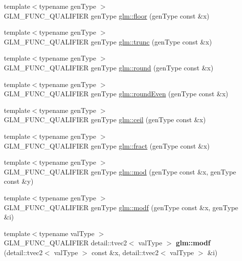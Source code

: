 \begin{DoxyCompactItemize}
\item 
{\footnotesize template$<$typename gen\+Type $>$ }\\G\+L\+M\+\_\+\+F\+U\+N\+C\+\_\+\+Q\+U\+A\+L\+I\+F\+I\+E\+R gen\+Type \hyperlink{group__core__func__common_ga86350252cc9bf86421317460bbd1f21c}{glm\+::floor} (gen\+Type const \&x)
\item 
{\footnotesize template$<$typename gen\+Type $>$ }\\G\+L\+M\+\_\+\+F\+U\+N\+C\+\_\+\+Q\+U\+A\+L\+I\+F\+I\+E\+R gen\+Type \hyperlink{group__core__func__common_gadb091aed51e45872f6dc841affa41c5c}{glm\+::trunc} (gen\+Type const \&x)
\item 
{\footnotesize template$<$typename gen\+Type $>$ }\\G\+L\+M\+\_\+\+F\+U\+N\+C\+\_\+\+Q\+U\+A\+L\+I\+F\+I\+E\+R gen\+Type \hyperlink{group__core__func__common_ga75ebab3fe88a9c5c769135cf5a2649ef}{glm\+::round} (gen\+Type const \&x)
\item 
{\footnotesize template$<$typename gen\+Type $>$ }\\G\+L\+M\+\_\+\+F\+U\+N\+C\+\_\+\+Q\+U\+A\+L\+I\+F\+I\+E\+R gen\+Type \hyperlink{group__core__func__common_ga6535952553479a4bbca7f1f12a011b17}{glm\+::round\+Even} (gen\+Type const \&x)
\item 
{\footnotesize template$<$typename gen\+Type $>$ }\\G\+L\+M\+\_\+\+F\+U\+N\+C\+\_\+\+Q\+U\+A\+L\+I\+F\+I\+E\+R gen\+Type \hyperlink{group__core__func__common_gab81e02fff55c9391e28fa47e68c3c903}{glm\+::ceil} (gen\+Type const \&x)
\item 
{\footnotesize template$<$typename gen\+Type $>$ }\\G\+L\+M\+\_\+\+F\+U\+N\+C\+\_\+\+Q\+U\+A\+L\+I\+F\+I\+E\+R gen\+Type \hyperlink{group__core__func__common_gad04ac2908d032d5518d5f6c8403dbc8b}{glm\+::fract} (gen\+Type const \&x)
\item 
{\footnotesize template$<$typename gen\+Type $>$ }\\G\+L\+M\+\_\+\+F\+U\+N\+C\+\_\+\+Q\+U\+A\+L\+I\+F\+I\+E\+R gen\+Type \hyperlink{group__core__func__common_ga8cc8a75b05125fe1c30de43102ef42e1}{glm\+::mod} (gen\+Type const \&x, gen\+Type const \&y)
\item 
{\footnotesize template$<$typename gen\+Type $>$ }\\G\+L\+M\+\_\+\+F\+U\+N\+C\+\_\+\+Q\+U\+A\+L\+I\+F\+I\+E\+R gen\+Type \hyperlink{group__core__func__common_gae47da02eb07d660201c09a0df7298a05}{glm\+::modf} (gen\+Type const \&x, gen\+Type \&i)
\item 
\hypertarget{namespaceglm_a543475fad30f0ae13c4953345d2c857e}{}{\footnotesize template$<$typename val\+Type $>$ }\\G\+L\+M\+\_\+\+F\+U\+N\+C\+\_\+\+Q\+U\+A\+L\+I\+F\+I\+E\+R detail\+::tvec2$<$ val\+Type $>$ {\bfseries glm\+::modf} (detail\+::tvec2$<$ val\+Type $>$ const \&x, detail\+::tvec2$<$ val\+Type $>$ \&i)\label{namespaceglm_a543475fad30f0ae13c4953345d2c857e}


\end{DoxyCompactItemize}
